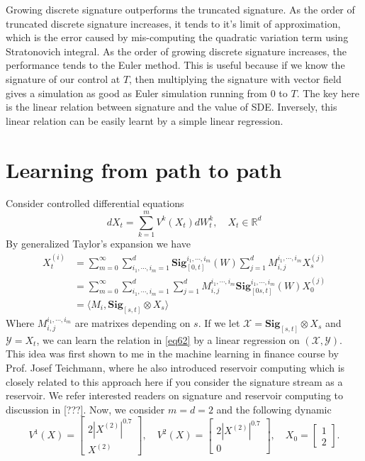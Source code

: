 \documentclass[12pt]{report}
\theoremstyle{definition}
\theoremstyle{remark}
\newcommand{\R}{\mathbb{R}}
\begin{document}
Growing discrete signature outperforms the truncated signature. As the order of truncated discrete signature increases, it tends to it's limit of approximation, which is the error caused by mis-computing the quadratic variation term using Stratonovich integral. As the order of growing discrete signature increases, the performance tends to the Euler method. This is useful because if we know the signature of our control at $T$, then multiplying the signature with vector field gives a simulation as good as Euler simulation running from $0$ to $T$. The key here is the linear relation between signature and the value of SDE. Inversely, this linear relation can be easily learnt by a simple linear regression.

\section{Learning from path to path}
Consider controlled differential equations 
\begin{equation}
  dX_{t} = \sum_{k=1}^{m}V^{k}(X_{t})dW^{k}_{t},\quad X_{t}\in\R^{d}
\end{equation}
By generalized Taylor's expansion we have 
\begin{equation}\label{eq62}
    \begin{split}
        X^{(i)}_{t} &= \sum_{m=0}^{\infty}\sum_{i_{1},\cdots,i_{m} = 1}^{d}\mathbf{Sig}_{[0,t]}^{i_{1},\cdots,i_{m}}(W)\sum_{j=1}^{d}M^{i_{1},\cdots,i_{m}}_{i,j}X^{(j)}_{s}\\
        &= \sum_{m=0}^{\infty}\sum_{i_{1},\cdots,i_{m} = 1}^{d}\sum_{j=1}^{d}M^{i_{1},\cdots,i_{m}}_{i,j} \mathbf{Sig}_{[0s,t]}^{i_{1},\cdots,i_{m}}(W) X^{(j)}_{0}\\
        &= \langle M_{i} ,  \mathbf{Sig}_{[s,t]} \otimes X_{s} \rangle
    \end{split}
\end{equation}
Where $M^{i_{1},\cdots,i_{m}}_{i,j}$ are matrixes depending on $s$. If we let $\mathcal{X} = \mathbf{Sig}_{[s,t]} \otimes X_{s}$ and $\mathcal{Y} = X_{t}$, we can learn the relation in \eqref{eq62} by a linear regression on $(\mathcal{X},\mathcal{Y})$. This idea was first shown to me in the machine learning in finance course by Prof. Josef Teichmann, where he also introduced reservoir computing which is closely related to this approach here if you consider the signature stream as a reservoir. We refer interested readers on signature and reservoir computing to discussion in [???]. Now, we consider $m = d = 2$ and the following dynamic
\begin{equation*}
  V^{1}(X) = \begin{bmatrix}
    2|X^{(2)}|^{0.7}\\
    X^{(2)}
  \end{bmatrix},\quad 
  V^{2}(X) = \begin{bmatrix}
    2|X^{(2)}|^{0.7}\\
    0
  \end{bmatrix},\quad 
  X_{0} = \begin{bmatrix}
    1\\
    2
  \end{bmatrix}.
\end{equation*}
\end{document}
